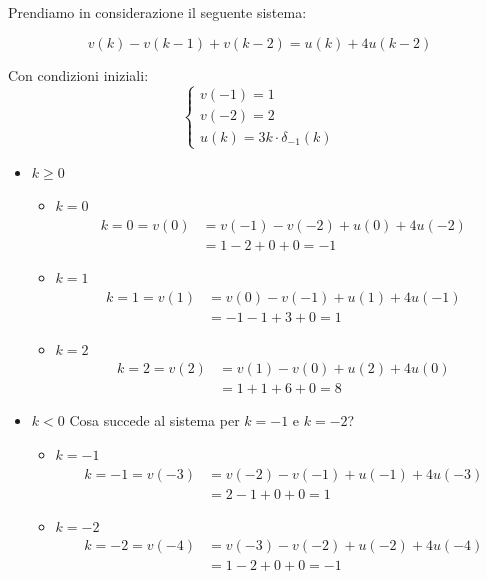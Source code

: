 \documentclass[a4paper]{article}
\begin{document}
\begin{example}
  Prendiamo in considerazione il seguente sistema:

  \[
  v(k) - v(k-1) + v(k-2) = u(k) + 4u(k-2)
  \] 

  \vspace{1em}
  \noindent
  Con condizioni iniziali:
  \[
  \begin{cases}
    v(-1) = 1\\
    v(-2) = 2\\
    u(k) = 3k \cdot \delta_{-1}(k)
  \end{cases}
  \] 

  \vspace{1em}
  \noindent
  \begin{itemize}
    \item \( k \ge 0 \) 
      \begin{itemize}
        \item \( k = 0 \) 
          \[
            \begin{aligned}
              k = 0 = v(0) &= v(-1) - v(-2) + u(0) + 4u(-2)\\
                           &= 1 - 2 + 0 + 0 = -1
            \end{aligned}
          \] 
        \item \( k = 1 \) 
          \[
            \begin{aligned}
              k = 1 = v(1) &= v(0) - v(-1) + u(1) + 4u(-1)\\
                           &= -1 - 1 + 3 + 0 = 1
            \end{aligned}
          \] 
        \item \( k = 2 \) 
          \[
            \begin{aligned}
              k = 2 = v(2) &= v(1) - v(0) + u(2) + 4u(0)\\
                           &= 1 + 1 + 6 + 0 = 8
            \end{aligned}
          \] 
      \end{itemize}
    \item \( k < 0 \) Cosa succede al sistema per \( k = -1 \) e \( k = -2 \)?
      \begin{itemize}
        \item \( k = -1 \) 
          \[
            \begin{aligned}
              k = -1 = v(-3) &= v(-2) - v(-1) + u(-1) + 4u(-3)\\
                            &= 2 - 1 + 0 + 0 = 1
            \end{aligned}
          \] 
        \item \( k = -2 \) 
          \[
            \begin{aligned}
              k = -2 = v(-4) &= v(-3) - v(-2) + u(-2) + 4u(-4)\\
                            &= 1 - 2 + 0 + 0 = -1
            \end{aligned}
          \]
      \end{itemize}
  \end{itemize}
\end{example}
\end{document}

